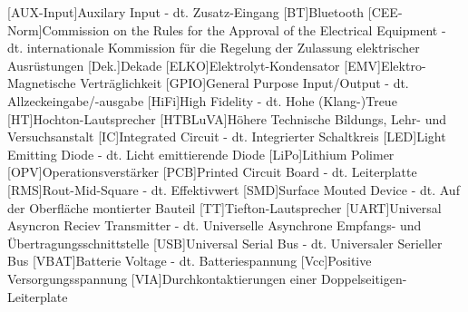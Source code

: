 
\begin{acronym}[ACRONYM]
[AUX-Input]{Auxilary Input - dt. Zusatz-Eingang}
[BT]{Bluetooth}
[CEE-Norm]{Commission on the Rules for the Approval of the Electrical Equipment - dt. internationale Kommission für die Regelung der Zulassung elektrischer Ausrüstungen}
[Dek.]{Dekade}
[ELKO]{Elektrolyt-Kondensator}
[EMV]{Elektro-Magnetische Verträglichkeit}
[GPIO]{General Purpose Input/Output - dt. Allzeckeingabe/-ausgabe}
[HiFi]{High Fidelity - dt. Hohe (Klang-)Treue}
[HT]{Hochton-Lautsprecher}
[HTBLuVA]{Höhere Technische Bildungs, Lehr- und Versuchsanstalt}
[IC]{Integrated Circuit - dt. Integrierter Schaltkreis}
[LED]{Light Emitting Diode - dt. Licht emittierende Diode}
[LiPo]{Lithium Polimer}
[OPV]{Operationsverstärker}
[PCB]{Printed Circuit Board - dt. Leiterplatte}
[RMS]{Rout-Mid-Square - dt. Effektivwert}
[SMD]{Surface Mouted Device - dt. Auf der Oberfläche montierter Bauteil}
[TT]{Tiefton-Lautsprecher}
[UART]{Universal Asyncron Reciev Transmitter - dt. Universelle Asynchrone Empfangs- und Übertragungsschnittstelle}
[USB]{Universal Serial Bus - dt. Universaler Serieller Bus}
[VBAT]{Batterie Voltage - dt. Batteriespannung}
[Vcc]{Positive Versorgungsspannung}
[VIA]{Durchkontaktierungen einer Doppelseitigen-Leiterplate}


\end{acronym}\newpage

